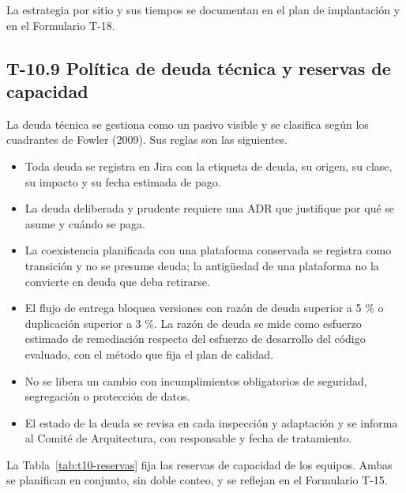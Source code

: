 \documentclass[11pt]{article}
\providecommand{\tightlist}{%
  \setlength{\itemsep}{0pt}\setlength{\parskip}{0pt}}
\begin{document}
La estrategia por sitio y sus tiempos se documentan en el plan de implantación y en el Formulario T-18.

\subsection{T-10.9 Política de deuda técnica y reservas de capacidad}\label{t10-9}

La deuda técnica se gestiona como un pasivo visible y se clasifica según los cuadrantes de Fowler (2009). Sus reglas son las siguientes.

\begin{itemize}
\tightlist
\item
  Toda deuda se registra en Jira con la etiqueta de deuda, su origen, su clase, su impacto y su fecha estimada de pago.
\item
  La deuda deliberada y prudente requiere una ADR que justifique por qué se asume y cuándo se paga.
\item
  La coexistencia planificada con una plataforma conservada se registra como transición y no se presume deuda; la antigüedad de una plataforma no la convierte en deuda que deba retirarse.
\item
  El flujo de entrega bloquea versiones con razón de deuda superior a 5 \% o duplicación superior a 3 \%. La razón de deuda se mide como esfuerzo estimado de remediación respecto del esfuerzo de desarrollo del código evaluado, con el método que fija el plan de calidad.
\item
  No se libera un cambio con incumplimientos obligatorios de seguridad, segregación o protección de datos.
\item
  El estado de la deuda se revisa en cada inspección y adaptación y se informa al Comité de Arquitectura, con responsable y fecha de tratamiento.
\end{itemize}

La Tabla~\mbox{\ref{tab:t10-reservas}} fija las reservas de capacidad de los equipos. Ambas se planifican en conjunto, sin doble conteo, y se reflejan en el Formulario T-15.
\end{document}
